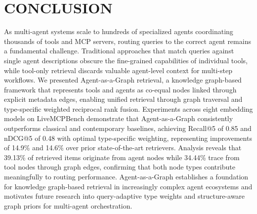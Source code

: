 \documentclass[a4paper,twoside]{article}
\begin{document}
\section{\uppercase{Conclusion}}
\label{sec:conclusion}

As multi-agent systems scale to hundreds of specialized agents coordinating thousands of tools and MCP servers, routing queries to the correct agent remains a fundamental challenge. Traditional approaches that match queries against single agent descriptions obscure the fine-grained capabilities of individual tools, while tool-only retrieval discards valuable agent-level context for multi-step workflows. We presented Agent-as-a-Graph retrieval, a knowledge graph-based framework that represents tools and agents as co-equal nodes linked through explicit metadata edges, enabling unified retrieval through graph traversal and type-specific weighted reciprocal rank fusion. Experiments across eight embedding models on LiveMCPBench demonstrate that Agent-as-a-Graph consistently outperforms classical and contemporary baselines, achieving Recall@5 of 0.85 and nDCG@5 of 0.48 with optimal type-specific weighting, representing improvements of 14.9\% and 14.6\% over prior state-of-the-art retrievers. Analysis reveals that 39.13\% of retrieved items originate from agent nodes while 34.44\% trace from tool nodes through graph edges, confirming that both node types contribute meaningfully to routing performance. Agent-as-a-Graph establishes a foundation for knowledge graph-based retrieval in increasingly complex agent ecosystems and motivates future research into query-adaptive type weights and structure-aware graph priors for multi-agent orchestration.

\clearpage



{\small
}
\end{document}
